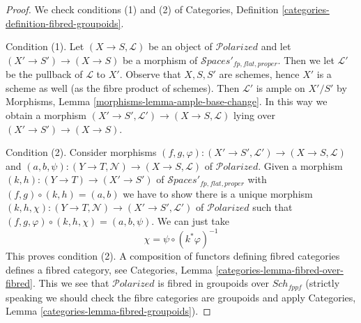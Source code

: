 \documentclass{stacks-project}
\theoremstyle{plain}
\theoremstyle{definition}
\theoremstyle{remark}
\numberwithin{equation}{subsection}
\def\Sch{\mathit{Sch}}
\def\Spacesstack{\mathcal{S}\!\mathit{paces}}
\def\Polarizedstack{\mathcal{P}\!\mathit{olarized}}
\begin{document}
\begin{proof}
We check conditions (1) and (2) of
Categories, Definition \ref{categories-definition-fibred-groupoids}.

\medskip\noindent
Condition (1). Let $(X \to S, \mathcal{L})$ be an object of
$\Polarizedstack$ and let $(X' \to S') \to (X \to S)$
be a morphism of $\Spacesstack'_{fp, flat, proper}$. Then we
let $\mathcal{L}'$ be the pullback of $\mathcal{L}$ to $X'$.
Observe that $X, S, S'$ are schemes, hence $X'$ is a scheme
as well (as the fibre product of schemes). Then
$\mathcal{L}'$ is ample on $X'/S'$ by
Morphisms, Lemma \ref{morphisms-lemma-ample-base-change}.
In this way we obtain a morphism
$(X' \to S', \mathcal{L}') \to (X \to S, \mathcal{L})$
lying over $(X' \to S') \to (X \to S)$.

\medskip\noindent
Condition (2). Consider morphisms
$(f, g, \varphi) : (X' \to S', \mathcal{L}') \to (X \to S, \mathcal{L})$ and
$(a, b, \psi) : (Y \to T, \mathcal{N}) \to (X \to S, \mathcal{L})$
of $\Polarizedstack$. Given a morphism $(k, h) : (Y \to T) \to (X' \to S')$
of $\Spacesstack'_{fp, flat, proper}$
with $(f, g) \circ (k, h) = (a, b)$ we have to show
there is a unique morphism
$(k, h, \chi) : (Y \to T, \mathcal{N}) \to (X' \to S', \mathcal{L}')$
of $\Polarizedstack$ such that
$(f, g, \varphi) \circ (k, h, \chi) = (a, b, \psi)$.
We can just take
$$
\chi = \psi \circ (k^*\varphi)^{-1}
$$
This proves condition (2). A composition of functors defining
fibred categories defines a fibred category, see
Categories, Lemma \ref{categories-lemma-fibred-over-fibred}.
This we see that $\Polarizedstack$ is fibred in groupoids over
$\Sch_{fppf}$ (strictly speaking we should check the fibre
categories are groupoids and apply
Categories, Lemma \ref{categories-lemma-fibred-groupoids}).
\end{proof}
\end{document}
